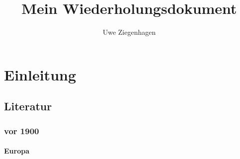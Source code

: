 \documentclass[12pt,ngerman]{scrreprt}
\title{Mein Wiederholungsdokument}
\author{Uwe Ziegenhagen}
\begin{document}
\maketitle

\tableofcontents

\chapter{Einleitung}

\section{Literatur}

\subsection{vor 1900}

\subsubsection{Europa}

\blindtext
\end{document}

